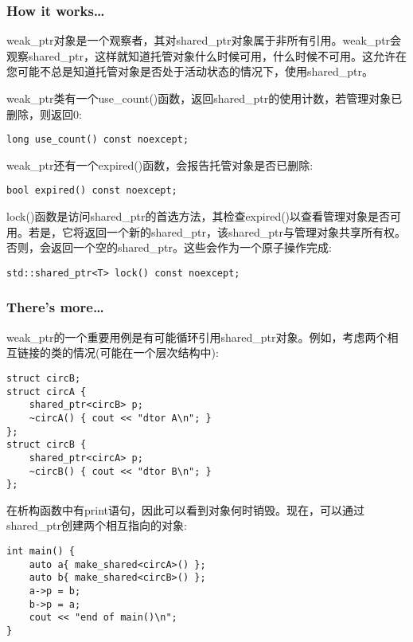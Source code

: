 \subsubsection{How it works…}

weak\_ptr对象是一个观察者，其对shared\_ptr对象属于非所有引用。weak\_ptr会观察shared\_ptr，这样就知道托管对象什么时候可用，什么时候不可用。这允许在您可能不总是知道托管对象是否处于活动状态的情况下，使用shared\_ptr。

weak\_ptr类有一个use\_count()函数，返回shared\_ptr的使用计数，若管理对象已删除，则返回0:

\begin{lstlisting}[style=styleCXX]
long use_count() const noexcept;
\end{lstlisting}

weak\_ptr还有一个expired()函数，会报告托管对象是否已删除:

\begin{lstlisting}[style=styleCXX]
bool expired() const noexcept;
\end{lstlisting}

lock()函数是访问shared\_ptr的首选方法，其检查expired()以查看管理对象是否可用。若是，它将返回一个新的shared\_ptr，该shared\_ptr与管理对象共享所有权。否则，会返回一个空的shared\_ptr。这些会作为一个原子操作完成:

\begin{lstlisting}[style=styleCXX]
std::shared_ptr<T> lock() const noexcept;
\end{lstlisting}


\subsubsection{There's more…}

weak\_ptr的一个重要用例是有可能循环引用shared\_ptr对象。例如，考虑两个相互链接的类的情况(可能在一个层次结构中):

\begin{lstlisting}[style=styleCXX]
struct circB;
struct circA {
	shared_ptr<circB> p;
	~circA() { cout << "dtor A\n"; }
};
struct circB {
	shared_ptr<circA> p;
	~circB() { cout << "dtor B\n"; }
};
\end{lstlisting}

在析构函数中有print语句，因此可以看到对象何时销毁。现在，可以通过shared\_ptr创建两个相互指向的对象:

\begin{lstlisting}[style=styleCXX]
int main() {
	auto a{ make_shared<circA>() };
	auto b{ make_shared<circB>() };
	a->p = b;
	b->p = a;
	cout << "end of main()\n";
}
\end{lstlisting}

